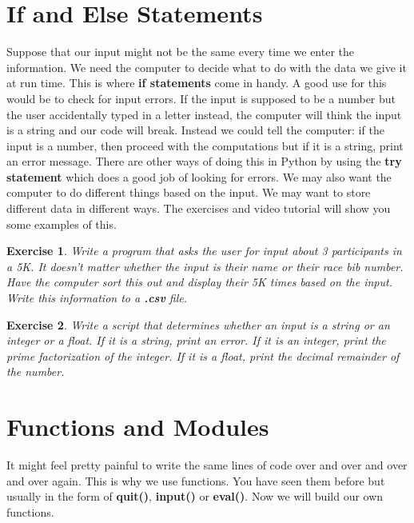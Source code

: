 \documentclass[12pt]{amsart}
\newtheorem{quest}{Exercise}
\theoremstyle{definition}
\begin{document}
\section{If and Else Statements}%

Suppose that our input might not be the same every time we enter the information. We need the computer to decide what to do with the data we give it at run time. This is where \textbf{if statements} come in handy. A good use for this would be to check for input errors. If the input is supposed to be a number but the user accidentally typed in a letter instead, the computer will think the input is a string and our code will break. Instead we could tell the computer: if the input is a number, then proceed with the computations but if it is a string, print an error message. There are other ways of doing this in Python by using the \textbf{try statement} which does a good job of looking for errors. We may also want the computer to do different things based on the input. We may want to store different data in different ways. The exercises and video tutorial will show you some examples of this.

\begin{quest}
Write a program that asks the user for input about 3 participants in a 5K. It doesn't matter whether the input is their name or their race bib number. Have the computer sort this out and display their 5K times based on the input. Write this information to a \textbf{.csv} file.
\end{quest}
\begin{quest}
Write a script that determines whether an input is a string or an integer or a float. If it is a string, print an error. If it is an integer, print the prime factorization of the integer. If it is a float, print the decimal remainder of the number.
\end{quest}

\section{Functions and Modules}%

It might feel pretty painful to write the same lines of code over and over and over and over again. This is why we use functions. You have seen them before but usually in the form of \textbf{quit()}, \textbf{input()} or \textbf{eval()}. Now we will build our own functions.
\end{document}
